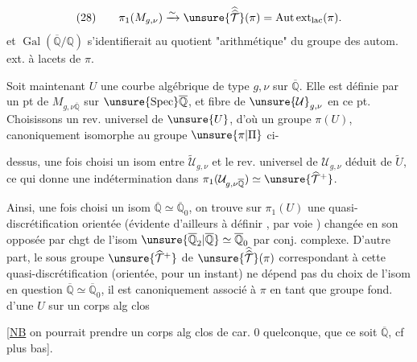 \[
(28)\qquad \pi_1(M_{g,\nu})\xrightarrow{\sim}\unsure{\widehat{\widehat{\mathcal T}}}(\pi)
=\operatorname{Aut\,ext}_{\mathrm{lac}}(\pi).
\]
et $\operatorname{Gal}(\overline{\mathbb Q}/\mathbb Q)$ s'identifierait au quotient "arithmétique" du groupe des autom. ext. à lacets de $\pi$.

Soit maintenant $U$ une courbe algébrique de type $g,\nu$ sur $\overline{\mathbb Q}$. Elle est définie par un pt de $M_{g,\nu\overline{\mathbb Q}}$ sur $\unsure{\operatorname{Spec}}\overline{\mathbb Q}$, et   fibre de $\unsure{\mathcal U}_{g,\nu}$ en ce pt. Choisissons un rev. universel de $\unsure{U}$, d'où un groupe $\pi(U)$, canoniquement isomorphe au groupe $\unsure{\pi|\Pi}$ ci-


dessus, une fois choisi un isom entre $\widetilde{\mathcal U}_{g,\nu}$ et le rev. universel de $\mathcal U_{g,\nu}$ déduit de $\widetilde U$, ce qui donne une indétermination dans $\pi_1(\mathcal U_{g,\nu\overline{\mathbb Q}})\simeq\unsure{\widehat{\mathcal T}^{+}}$.

Ainsi, une fois choisi un isom $\overline{\mathbb Q}\simeq\overline{\mathbb Q}_0$, on trouve sur $\pi_1(U)$ une quasi-discrétification orientée (évidente d'ailleurs à définir , par voie ) changée en son opposée par chgt de l'isom $\unsure{\overline{\mathbb Q}_2|\overline{\mathbb Q}}\simeq\overline{\mathbb Q}_0$ par conj. complexe. D'autre part, le sous groupe $\unsure{\widehat{\mathcal T}^{+}}$ de $\unsure{\widehat{\widehat{\mathcal T}}}(\pi)$ correspondant à cette quasi-discrétification (orientée, pour un instant) ne dépend pas du choix de l'isom en question $\overline{\mathbb Q}\simeq\overline{\mathbb Q}_0$, il est canoniquement associé à $\pi$ en tant que groupe fond. d'une $U$ sur  un corps alg clos

[\uline{NB} on pourrait prendre un corps alg clos de car. $0$ quelconque,  que ce soit  $\overline{\mathbb Q}$, cf plus bas].




